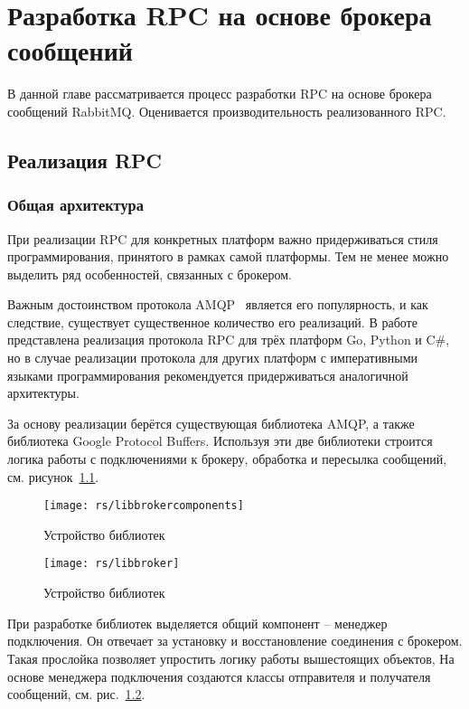 \chapter{Разработка RPC на основе брокера сообщений}
В данной главе рассматривается процесс разработки RPC на основе
брокера сообщений RabbitMQ. Оценивается производительность реализованного RPC.

\section{Реализация RPC}

\subsection{Общая архитектура}
При реализации RPC для конкретных платформ важно придерживаться стиля
программирования, принятого в рамках самой платформы. Тем не менее
можно выделить ряд особенностей, связанных с брокером.

Важным достоинством протокола AMQP~\cite{amqp} является его популярность,
и как следствие, существует существенное количество его реализаций.
В работе представлена реализация протокола RPC для трёх платформ Go, Python
и C\#, но в случае реализации протокола для других платформ с императивными
языками программирования рекомендуется придерживаться аналогичной архитектуры.

За основу реализации берётся существующая библиотека AMQP, а также библиотека
Google Protocol Buffers. Используя эти две библиотеки строится логика работы
с подключениями к брокеру, обработка и пересылка сообщений,
см. рисунок~\ref{fig:libbrokercomponents}.

\begin{figure}[H]
    \centering
    \texttt{[image: rs/libbrokercomponents]}
    \caption{Устройство библиотек}
    \label{fig:libbrokercomponents}
\end{figure}

\begin{figure}[H]
    \centering
    \texttt{[image: rs/libbroker]}
    \caption{Устройство библиотек}
    \label{fig:libbroker}
\end{figure}

При разработке библиотек выделяется общий компонент -- менеджер подключения.
Он отвечает за установку и восстановление соединения с брокером.
Такая прослойка позволяет упростить логику работы вышестоящих объектов,
На основе менеджера подключения создаются классы отправителя и получателя
сообщений, см. рис.~\ref{fig:libbroker}.

